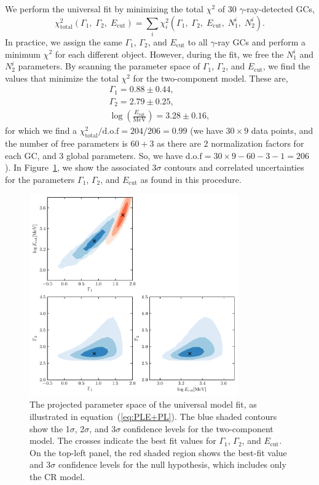 \documentclass[doublespace,nopageskip]{VTthesis} %
\begin{document}
We perform the universal fit by minimizing the total $\chi^2$ of 30 $\gamma$-ray-detected GCs,
\begin{equation}
    \chi^2_\mathrm{total}(\Gamma_1,\;\Gamma_2,\;E_\mathrm{cut}) = \sum_i\chi_i^2(\Gamma_1,\;\Gamma_2,\;E_\mathrm{cut},\;N_1^i,\;N_2^i).
\end{equation}
In practice, we assign the same $\Gamma_1$, $\Gamma_2$, and $E_\mathrm{cut}$ to all $\gamma$-ray GCs and perform a minimum $\chi^2$ for each different object. However, during the fit, we free the $N_1^i$ and $N_2^i$ parameters. By scanning the parameter space of $\Gamma_1$, $\Gamma_2$, and $E_\mathrm{cut}$, we find the values that minimize the total $\chi^2$ for the two-component model. These are, 
\begin{align}\nonumber
    \Gamma_1 = 0.88 \pm 0.44,\\\nonumber
    \Gamma_2 = 2.79 \pm 0.25,\\\nonumber
    \log\left(\frac{E_\mathrm{cut}}{\mathrm{MeV}}\right) = 3.28 \pm 0.16,
\end{align}
for which we find a $\chi^2_\mathrm{total} / \mathrm{d.o.f} = 204/206 = 0.99$ (we have $30\times 9$ data points, and the number of free parameters is $60+3$ as there are 2 normalization factors for each GC, and 3 global parameters. So, we have $\mathrm{d.o.f}=30\times 9 - 60 - 3 -1 = 206$). In Figure~\ref{fig:global}, we show the associated 3$\sigma$ contours and correlated uncertainties for the parameters $\Gamma_1$, $\Gamma_2$, and $E_\mathrm{cut}$ as found in this procedure.

\begin{figure}
    \includegraphics[width=0.8\textwidth]{Figures/Globular/globalfit.pdf}
    \caption{The projected parameter space of the universal model fit, as illustrated in equation~(\ref{eq:PLE+PL}). The blue shaded contours show the 1$\sigma$, 2$\sigma$, and 3$\sigma$ confidence levels for the two-component model. The crosses indicate the best fit values for $\Gamma_1$, $\Gamma_2$, and $E_\mathrm{cut}$. On the top-left panel, the red shaded region shows the best-fit value and 3$\sigma$ confidence levels for the null hypothesis, which includes only the CR model.}
    \label{fig:global}
\end{figure}
\end{document}
